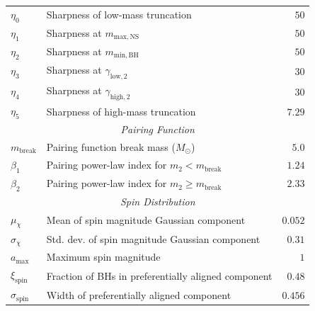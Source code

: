 \begin{table}[htb]
\begin{tabular}{llr}
\midrule
$\eta_0$ & Sharpness of low-mass truncation & $50$ \\
$\eta_1$ & Sharpness at $m_{\mathrm{max,NS}}$ & $50$ \\
$\eta_2$ & Sharpness at $m_{\mathrm{min,BH}}$ & $50$ \\
$\eta_3$ & Sharpness at $\gamma_{\mathrm{low},2}$ & $30$ \\
$\eta_4$ & Sharpness at $\gamma_{\mathrm{high},2}$ & $30$ \\
$\eta_5$ & Sharpness of high-mass truncation & $7.29$ \\

\midrule
\multicolumn{3}{c}{\textit{Pairing Function}} \\
\midrule
$m_{\mathrm{break}}$ & Pairing function break mass ($M_\odot$) & $5.0$ \\
$\beta_1$ & Pairing power-law index for $m_2 < m_{\mathrm{break}}$ & $1.24$ \\
$\beta_2$ & Pairing power-law index for $m_2 \geq m_{\mathrm{break}}$ & $2.33$ \\

\midrule
\multicolumn{3}{c}{\textit{Spin Distribution}} \\
\midrule
$\mu_{\chi}$ & Mean of spin magnitude Gaussian component & $0.052$ \\
$\sigma_{\chi}$ & Std. dev. of spin magnitude Gaussian component & $0.31$ \\
$a_{\mathrm{max}}$ & Maximum spin magnitude & $1$ \\
\midrule
$\xi_{\mathrm{spin}}$ & Fraction of BHs in preferentially aligned component & $0.48$ \\
$\sigma_{\mathrm{spin}}$ & Width of preferentially aligned component & $0.456$ \\
\bottomrule
\end{tabular}
\end{table}
